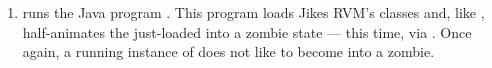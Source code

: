 \begin{enumerate}
\item {} runs the Java program
.  This program loads Jikes RVM's classes
and, like \gid, half-animates the just-loaded \jrvm{} into a zombie
state --- this time, via .  Once
again, a running instance of \jrvm{} does not like to become into a
zombie.

\end{enumerate}




